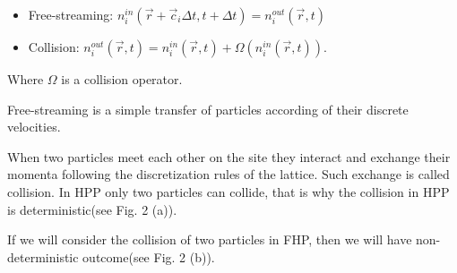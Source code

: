 \begin{itemize}
\item Free-streaming: $ n_i^{in}(\vec{r}+\vec{c}_{i}\Delta t, t+\Delta t) = n_i^{out}(\vec{r}, t) $
\item Collision: $ n_i^{out}(\vec{r}, t) = n_i^{in}(\vec{r}, t) + \Omega(n_i^{in}(\vec{r}, t)) $.
\end{itemize}
Where $\Omega$ is a collision operator.

Free-streaming is a simple transfer of particles according of their discrete velocities.

When two particles meet each other on the site they interact and exchange their momenta following the discretization rules of the lattice. Such exchange is called collision. In HPP only two particles can collide, that is why the collision in HPP is deterministic(see Fig. 2 (a)).

If we will consider the collision of two particles in FHP, then we will have non-deterministic outcome(see Fig. 2 (b)).


